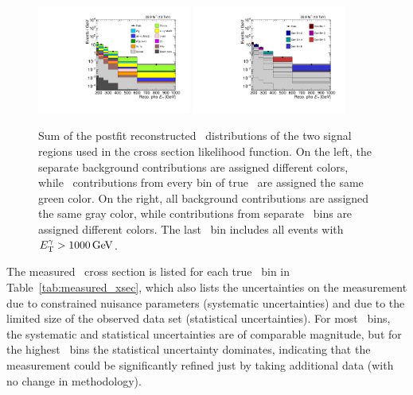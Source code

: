 \begin{figure}[htbp]
  \begin{center}
    \includegraphics[width=0.45\textwidth]{figures/xsec_results/Postfit/postfit_unfolding_b_phoPt.pdf}
    \includegraphics[width=0.45\textwidth]{figures/xsec_results/Postfit/postfit_unfolding_b_genPtAllocation_phoPt.pdf}
    \caption{
      Sum of the postfit reconstructed \ETgamma\ distributions of the two signal regions used in the cross section likelihood function.
      On the left, the separate background contributions are assigned different colors, while \zinvg\ contributions from every bin of true
      \pTgamma\ are assigned the same green color. On the right, all background contributions are assigned the same gray color, while
      contributions from separate \pTgamma\ bins are assigned different colors. The last \ETgamma\ bin includes all events
      with $\ETgamma > 1000\unit{GeV}$.
    }
    \label{fig:postfitXS_combSR}
  \end{center}
\end{figure}

The measured \zinvg\ cross section is listed for each true \pTgamma\ bin in Table~\ref{tab:measured_xsec}, which also lists the uncertainties on the
measurement due to constrained nuisance parameters (systematic uncertainties) and due to the limited size of the observed data set (statistical
uncertainties). For most \pTgamma\ bins, the systematic and statistical uncertainties are of comparable magnitude, but for the highest \pTgamma\ bins
the statistical uncertainty dominates, indicating that the measurement could be significantly refined just by taking additional data (with no change
in methodology).

